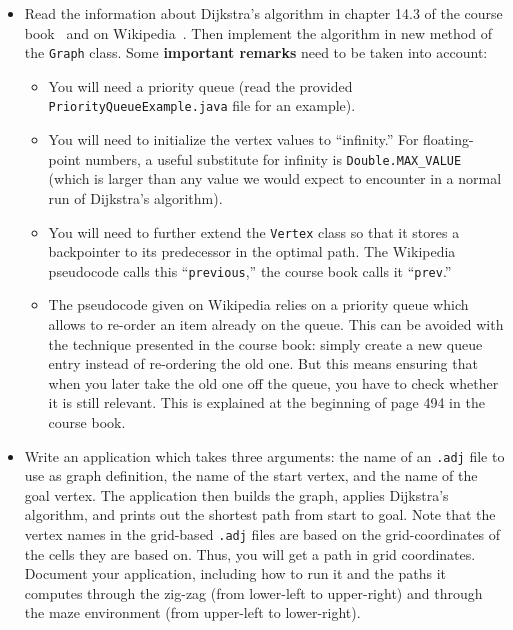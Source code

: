 \documentclass[a4paper,10pt]{article}
\begin{document}
\begin{itemize}
\item
  Read the information about Dijkstra's algorithm in chapter 14.3 of the course book~\cite{weiss:2005} and on Wikipedia~\cite{wikipedia:dijkstra}.
  Then implement the algorithm in new method of the \texttt{Graph} class.
  Some \textbf{important remarks} need to be taken into account:
  \begin{itemize}
  \item
    You will need a priority queue (read the provided \texttt{PriorityQueueExample.java} file for an example).
  \item
    You will need to initialize the vertex values to ``infinity.''
    For floating-point numbers, a useful substitute for infinity is \texttt{Double.MAX\_VALUE} (which is larger than any value we would expect to encounter in a normal run of Dijkstra's algorithm).
  \item
    You will need to further extend the \texttt{Vertex} class so that it stores a backpointer to its predecessor in the optimal path.
    The Wikipedia pseudocode calls this ``\texttt{previous},'' the course book calls it ``\texttt{prev}.''
  \item
    The pseudocode given on Wikipedia relies on a priority queue which allows to re-order an item already on the queue.
    This can be avoided with the technique presented in the course book:
    simply create a new queue entry instead of re-ordering the old one.
    But this means ensuring that when you later take the old one off the queue, you have to check whether it is still relevant.
    This is explained at the beginning of page 494 in the course book.
  \end{itemize}
  
\item
  Write an application which takes three arguments:
  the name of an \texttt{.adj} file to use as graph definition, the name of the start vertex, and the name of the goal vertex.
  The application then builds the graph, applies Dijkstra's algorithm, and prints out the shortest path from start to goal.
  Note that the vertex names in the grid-based \texttt{.adj} files are based on the grid-coordinates of the cells they are based on.
  Thus, you will get a path in grid coordinates.
  Document your application, including how to run it and the paths it computes through the zig-zag (from lower-left to upper-right) and through the maze environment (from upper-left to lower-right).
  
\end{itemize}
\end{document}
